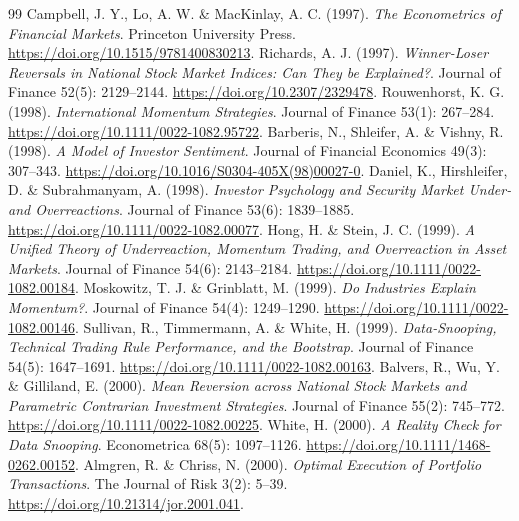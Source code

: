 \begin{thebibliography}{99}
 Campbell, J. Y., Lo, A. W. \& MacKinlay, A. C. (1997). \emph{The Econometrics of Financial Markets}. Princeton University Press. \href{https://doi.org/10.1515/9781400830213}{https://doi.org/10.1515/9781400830213}.
 Richards, A. J. (1997). \emph{Winner-Loser Reversals in National Stock Market Indices: Can They be Explained?}. Journal of Finance 52(5): 2129--2144. \href{https://doi.org/10.2307/2329478}{https://doi.org/10.2307/2329478}.
 Rouwenhorst, K. G. (1998). \emph{International Momentum Strategies}. Journal of Finance 53(1): 267--284. \href{https://doi.org/10.1111/0022-1082.95722}{https://doi.org/10.1111/0022-1082.95722}.
 Barberis, N., Shleifer, A. \& Vishny, R. (1998). \emph{A Model of Investor Sentiment}. Journal of Financial Economics 49(3): 307--343. \href{https://doi.org/10.1016/S0304-405X(98)00027-0}{https://doi.org/10.1016/S0304-405X(98)00027-0}.
 Daniel, K., Hirshleifer, D. \& Subrahmanyam, A. (1998). \emph{Investor Psychology and Security Market Under- and Overreactions}. Journal of Finance 53(6): 1839--1885. \href{https://doi.org/10.1111/0022-1082.00077}{https://doi.org/10.1111/0022-1082.00077}.
 Hong, H. \& Stein, J. C. (1999). \emph{A Unified Theory of Underreaction, Momentum Trading, and Overreaction in Asset Markets}. Journal of Finance 54(6): 2143--2184. \href{https://doi.org/10.1111/0022-1082.00184}{https://doi.org/10.1111/0022-1082.00184}.
 Moskowitz, T. J. \& Grinblatt, M. (1999). \emph{Do Industries Explain Momentum?}. Journal of Finance 54(4): 1249--1290. \href{https://doi.org/10.1111/0022-1082.00146}{https://doi.org/10.1111/0022-1082.00146}.
 Sullivan, R., Timmermann, A. \& White, H. (1999). \emph{Data-Snooping, Technical Trading Rule Performance, and the Bootstrap}. Journal of Finance 54(5): 1647--1691. \href{https://doi.org/10.1111/0022-1082.00163}{https://doi.org/10.1111/0022-1082.00163}.
 Balvers, R., Wu, Y. \& Gilliland, E. (2000). \emph{Mean Reversion across National Stock Markets and Parametric Contrarian Investment Strategies}. Journal of Finance 55(2): 745--772. \href{https://doi.org/10.1111/0022-1082.00225}{https://doi.org/10.1111/0022-1082.00225}.
 White, H. (2000). \emph{A Reality Check for Data Snooping}. Econometrica 68(5): 1097--1126. \href{https://doi.org/10.1111/1468-0262.00152}{https://doi.org/10.1111/1468-0262.00152}.
 Almgren, R. \& Chriss, N. (2000). \emph{Optimal Execution of Portfolio Transactions}. The Journal of Risk 3(2): 5--39. \href{https://doi.org/10.21314/jor.2001.041}{https://doi.org/10.21314/jor.2001.041}.

\end{thebibliography}
